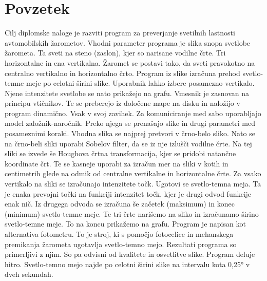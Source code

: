 \documentclass[oneside, a4paper, 12pt]{book}
\newcommand{\clearemptydoublepage}{\newpage{\pagestyle{empty}\cleardoublepage}}
\begin{document}
\clearemptydoublepage

\def\thepage{}%
\tableofcontents{}


\clearemptydoublepage

\chapter*{Povzetek}
\chaptermark{}
Cilj diplomske naloge je razviti program za preverjanje svetilnih 
lastnosti avtomobilskih žarometov. Vhodni parameter programa je slika 
snopa svetlobe žarometa. Ta sveti na steno (zaslon), kjer so narisane 
vodilne črte. Tri horizontalne in ena vertikalna. Žaromet se postavi 
tako, da sveti pravokotno na centralno vertikalno in horizontalno črto. 
Program iz slike izračuna prehod svetlo-temne meje po celotni širini 
slike. Uporabnik lahko izbere posamezno vertikalo. Njene intenzitete 
svetlobe se nato prikažejo na grafu. Vmesnik je zasnovan na principu 
vtičnikov. Te se preberejo iz določene mape na disku in naložijo v 
program dinamično. Vsak v svoj zavihek. Za komuniciranje med sabo 
uporabljajo model založnik-naročnik. Preko njega se prenašajo slike 
in drugi parametri med posameznimi koraki. Vhodna slika se najprej 
pretvori v črno-belo sliko. Nato se na črno-beli sliki uporabi Sobelov 
filter, da se iz nje izlušči vodilne črte. Na tej sliki se izvede še 
Houghova črtna transformacija, kjer se pridobi natančne koordinate črt. 
Te se kasneje uporabi za izračun mer na sliki v kotih in centimetrih 
glede na odmik od centralne vertikalne in horizontalne črte. Za vsako 
vertikalo na sliki se izračunajo intenzitete točk. Ugotovi se svetlo-temna 
meja. Ta je enaka prevojni točki na funkciji intenzitet točk, kjer je 
drugi odvod funkcije enak nič. Iz drugega odvoda se izračuna še začetek 
(maksimum) in konec (minimum) svetlo-temne meje. Te tri črte narišemo na 
sliko in izračunamo širino svetlo-temne meje. To na koncu prikažemo na 
grafu. Program je napisan kot alternativa fotometru. To je stroj, ki s 
pomočjo fotocelice in mehanskega premikanja žarometa ugotavlja svetlo-temno 
mejo. Rezultati programa so primerljivi z njim. So pa odvisni 
od kvalitete in osvetlitve slike. Program deluje hitro. Svetlo-temno 
mejo najde po celotni širini slike na intervalu kota 0,25° v dveh sekundah.
\clearemptydoublepage
\end{document}
